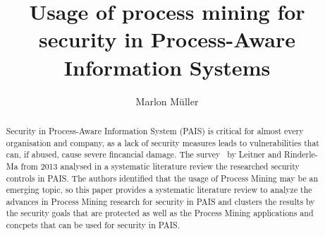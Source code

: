 \documentclass[runningheads]{llncs}
\begin{document}
%
\title{Usage of process mining for security in Process-Aware Information Systems}
%
%
\author{Marlon Müller}
%
%
%
\maketitle              %
%
\begin{abstract}
Security in Process-Aware Information System (PAIS) is critical for almost every organisation and company, as a lack of security measures leads to vulnerabilities that can, if abused, cause severe fincancial damage.
The survey~\cite{Leitner2014273} by Leitner and Rinderle-Ma from 2013 analysed in a systematic literature review the researched security controls in PAIS\@. The authors identified that the usage
of Process Mining may be an emerging topic, so this paper provides a systematic literature review to analyze the advances in Process Mining research for security in PAIS and clusters the results
by the security goals that are protected as well as the Process Mining applications and concpets that can be used for security in PAIS\@. 

\end{abstract}
%
%
%
\end{document}
